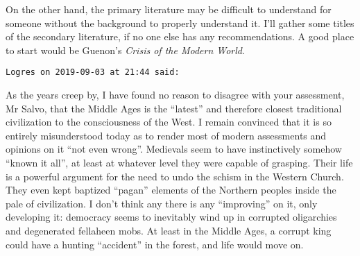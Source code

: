 \begin{footnotesize}
\begin{sffamily}
On the other hand, the primary literature may be difficult to understand for someone without the background to properly understand it. I'll gather some titles of the secondary literature, if no one else has any recommendations. A good place to start would be Guenon's \emph{Crisis of the Modern World}.


\hfill

\texttt{Logres on 2019-09-03 at 21:44 said:}

As the years creep by, I have found no reason to disagree with your assessment, Mr Salvo, that the Middle Ages is the “latest” and therefore closest traditional civilization to the consciousness of the West. I remain convinced that it is so entirely misunderstood today as to render most of modern assessments and opinions on it “not even wrong”. Medievals seem to have instinctively somehow “known it all”, at least at whatever level they were capable of grasping. Their life is a powerful argument for the need to undo the schism in the Western Church. They even kept baptized “pagan” elements of the Northern peoples inside the pale of civilization. I don't think any there is any “improving” on it, only developing it: democracy seems to inevitably wind up in corrupted oligarchies and degenerated fellaheen mobs. At least in the Middle Ages, a corrupt king could have a hunting “accident” in the forest, and life would move on.

\hfill
\end{sffamily}\end{footnotesize}